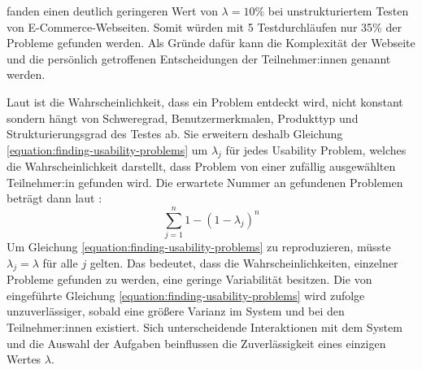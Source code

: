 \textcite{spoolTestingWeb2001} fanden einen deutlich geringeren Wert von $\lambda{}=10\%$ bei
unstrukturiertem Testen von E-Commerce-Webseiten. Somit würden mit 5 Testdurchläufen nur 35\% der
Probleme gefunden werden. Als Gründe dafür kann die Komplexität der Webseite und die persönlich
getroffenen Entscheidungen der Teilnehmer:innen genannt werden.
\parencite{spoolTestingWeb2001}

Laut \textcite{woolrychWhyWhen2001} ist die Wahrscheinlichkeit, dass ein Problem entdeckt wird,
nicht konstant sondern hängt von Schweregrad, Benutzermerkmalen, Produkttyp und Strukturierungsgrad
des Testes ab. Sie erweitern deshalb Gleichung \ref{equation:finding-usability-problems} um
$\lambda{}_j$ für jedes Usability Problem, welches die Wahrscheinlichkeit darstellt, dass Problem
von einer zufällig ausgewählten Teilnehmer:in gefunden wird. Die erwartete Nummer an gefundenen
Problemen beträgt dann laut \textcite{woolrychWhyWhen2001}:
\begin{equation}
  \sum_{j=1}^n 1-(1-\lambda{}_j)^n
\end{equation}
Um Gleichung \ref{equation:finding-usability-problems} zu reproduzieren, müsste $\lambda{}_j =
\lambda{}$ für alle $j$ gelten. Das bedeutet, dass die Wahrscheinlichkeiten, einzelner Probleme
gefunden zu werden, eine geringe Variabilität besitzen. Die von
\textcite{nielsenMathematicalModel1993} eingeführte Gleichung
\ref{equation:finding-usability-problems} wird \textcite{woolrychWhyWhen2001} zufolge
unzuverlässiger, sobald eine größere Varianz im System und bei den Teilnehmer:innen existiert. Sich
unterscheidende Interaktionen mit dem System und die Auswahl der Aufgaben beinflussen die
Zuverlässigkeit eines einzigen Wertes $\lambda{}$.
\parencite{woolrychWhyWhen2001}

